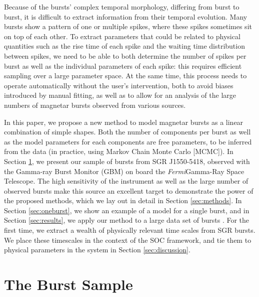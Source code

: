 \documentclass[12pt]{emulateapj}
\newcommand{\project}[1]{\textsl{#1}}
\newcommand{\fermi}{\project{Fermi}}
\begin{document}
Because of the bursts' complex temporal morphology, differing from burst to burst, it is difficult to extract information from their temporal evolution. 
Many bursts show a pattern of one or multiple spikes, where these spikes sometimes sit on top of each other. To extract parameters that could be related
to physical quantities such as the rise time of each spike and the waiting time distribution between spikes, we need to be able to both determine the 
number of spikes per burst as well as the individual parameters of each spike: this requires efficient sampling over a large parameter space.
At the same time, this process needs to operate automatically without the user's intervention, both to avoid biases introduced by manual fitting, as well as
 to allow for an analysis of the large numbers of magnetar bursts observed from various sources.

In this paper, we propose a new method to model magnetar bursts as a linear combination of simple shapes. Both the number of components
per burst as well as the model parameters for each components are free parameters, to be inferred from the data (in practice, using
Markov Chain Monte Carlo [MCMC]). In Section \ref{sec:data}, we present our sample of bursts from SGR J1550-5418, observed with the 
Gamma-ray Burst Monitor (GBM) on board the \fermi Gamma-Ray Space Telescope.
The high sensitivity of the instrument as well as 
the large number of observed bursts make this source an excellent target to demonstrate the power of the proposed methods, which we
lay out in detail in Section \ref{sec:methods}.
In Section \ref{sec:oneburst}, we show an example of a model for a single burst, and in Section \ref{sec:results}, we apply our method to a large data set of bursts . 
For the first time, we extract a wealth of physically relevant time scales from SGR bursts. 
We place these timescales in the context of the SOC framework, and tie them to physical parameters in the system in Section \ref{sec:discussion}.



\section{The Burst Sample}
\label{sec:data}
\end{document}
